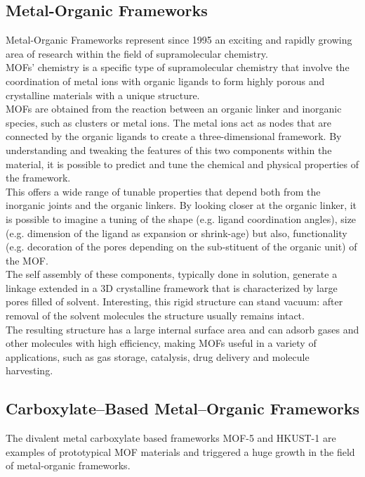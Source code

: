 \documentclass[../Master.tex]{subfiles}
\begin{document}
\subsection{Metal-Organic Frameworks}\label{subsec:mof}
Metal-Organic Frameworks represent since 1995 \cite{yaghi_hydrothermal_1995} an exciting and rapidly growing area of research within the field of supramolecular chemistry.\\
MOFs' chemistry is a specific type of supramolecular chemistry that involve the coordination of metal ions with organic ligands to form highly porous and crystalline materials with a unique structure. \\
MOFs are obtained from the reaction between an organic linker and inorganic species, such as clusters or metal ions. The metal ions act as nodes that are connected by the organic ligands to create a three-dimensional framework. By understanding and tweaking the features of this two components within the material, it is possible to predict and tune the chemical and physical properties of the framework. \\
This offers a wide range of tunable properties that depend both from the inorganic joints and the organic linkers. By looking closer at the organic linker, it is possible to imagine a tuning of the shape (e.g. ligand coordination angles), size (e.g. dimension of the ligand as expansion or shrink-age) but also, functionality (e.g. decoration of the pores depending on the sub-stituent of the organic unit) of the MOF. \\
The self assembly of these components, typically done in solution, generate a linkage extended in a 3D crystalline framework that is characterized by large pores filled of solvent. Interesting, this rigid structure can stand vacuum: after removal of the solvent molecules the structure usually remains intact. \\
The resulting structure has a large internal surface area and can adsorb gases and other molecules with high efficiency, making MOFs useful in a variety of applications, such as gas storage, catalysis, drug delivery and molecule harvesting.

\subsection{Carboxylate–Based Metal–Organic Frameworks}\label{cb-mof}
The divalent metal carboxylate based frameworks MOF-5 and HKUST-1 are examples of prototypical MOF materials and triggered a huge growth in the field of metal-organic frameworks.
\end{document}
